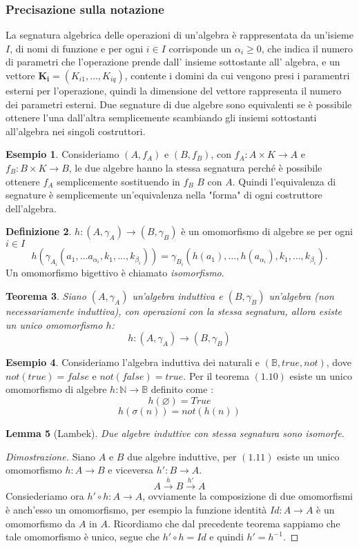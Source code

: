 \documentclass{article}
\newtheorem{theorem}{Teorema}[section]
\newtheorem{lemma}[theorem]{Lemma}
\theoremstyle{definition}
\theoremstyle{definition}
\theoremstyle{definition}
\newtheorem{definition}[theorem]{Definizione}
\newtheorem{example}[theorem]{Esempio}
\theoremstyle{remark}
\begin{document}
\subsubsection{Precisazione sulla notazione}
La segnatura algebrica delle operazioni di un'algebra è rappresentata da un'isieme $I$, di nomi di funzione e per ogni $i\in I$ corrisponde un $\alpha_i\ge 0$, che indica il numero di
parametri che l'operazione prende dall' insieme sottostante all' algebra, e un vettore $\mathbf{K_i}=(K_{i1},\dots,K_{iq})$, contente i domini da cui vengono presi i paramentri esterni per l'operazione,
quindi la dimensione del vettore  rappresenta il numero dei parametri esterni.
Due segnature di due algebre sono equivalenti se è possibile ottenere l'una dall'altra semplicemente scambiando gli insiemi sottostanti all'algebra nei singoli costruttori.
\begin{example}
    Consideriamo $(A,f_A)$ e $(B,f_B)$, con $f_A:A\times K \to A$ e \\$f_B:B\times K \to B$, le due algebre hanno la stessa segnatura perché è possibile ottenere $f_A$
        semplicemente sostituendo in $f_B$ $B$ con $A$. Quindi l'equivalenza di segnature è semplicemente un'equivalenza nella "forma" di ogni costruttore dell'algebra.
\end{example}
\begin{definition}  $h:(A,\gamma_A)\to(B,\gamma_B)$ è un omomorfismo di algebre se per ogni $ i\in I$
    $$h(\gamma_{A_i}(a_1,\dots a_{\alpha_i},k_1,\dots,k_{\beta_i})) = \gamma_{B_i}(h(a_1),\dots,h(a_{\alpha_i}),k_1,\dots, k_{\beta_i}). $$
    Un omomorfismo bigettivo è chiamato \textit{isomorfismo}.
\end{definition}
\begin{theorem}
    Siano $(A,\gamma_A)$ un'algebra induttiva e $(B,\gamma_B)$ un'algebra (non necessariamente induttiva), con operazioni con la
    stessa segnatura, allora esiste un unico omomorfismo  $h$:
    $$h:(A,\gamma_A)\to(B,\gamma_B)$$
\end{theorem}
\begin{example}
    Consideriamo l'algebra induttiva dei naturali e $(\mathbb{B},true,not)$, dove $not(true) = false$ e $not(false) = true$. Per il teorema $(1.10)$ esiste un unico omomorfismo di algebre $h:\mathbb{N}\to\mathbb{B}$ definito
    come :
    $$h(\varnothing) = True$$
    $$h(\sigma(n)) = not(h(n))$$
\end{example}
\begin{lemma}[Lambek] Due algebre induttive con stessa segnatura sono isomorfe.
\end{lemma}
\begin{proof}[Dimostrazione]

    Siano $A$ e $B$ due algebre induttive, per $\mathbf{(1.11)}$ esiste un unico omomorfismo $h:A\to B$ e viceversa $h':B\to A$.
    $$A\xrightarrow{h} B\xrightarrow{h'} A$$
    Consiederiamo ora $h'\circ h: A\to A$, ovviamente la composizione di due omomorfismi è anch'esso un omomorfismo, per esempio la funzione identità $Id: A\to A$ è un omomorfismo
    da $A$ in $A$. Ricordiamo che dal precedente teorema sappiamo che tale omomorfismo è unico, segue che $h'\circ h = Id$ e quindi $h' = h^{-1}$.
\end{proof}
\end{document}
